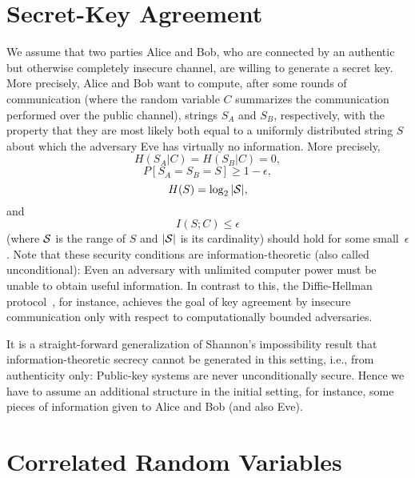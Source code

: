 \documentclass[a4paper, twoside, openany]{report}
\newcommand{\eps}{\epsilon}
\theoremstyle{plain}
\theoremstyle{definition}
\begin{document}

\section{Secret-Key Agreement}

We assume that two parties Alice and Bob, who are connected by an authentic but otherwise completely insecure channel, are willing to generate a secret key. More precisely, Alice and Bob want to compute, after some rounds of communication (where the random variable $C$ summarizes the communication performed over the public channel), strings $S_A$ and $S_B$, respectively, with the property that they are most likely both equal to a uniformly distributed string $S$ about which the adversary Eve has virtually no information.
More precisely,
\begin{equation} \label{ska:determined}
H(S_A|C) = H(S_B|C) = 0,
\end{equation}
\begin{equation} \label{ska:identical}
P[S_A = S_B = S] \geq 1-\eps,
\end{equation}
\begin{equation} \label{ska:uniform}
H(S)=\log_2|{\cal S}|,
\end{equation}
and
\begin{equation} \label{ska:secret}
I(S;C) \leq \eps
\end{equation}
(where ${\cal S}$ is the range of $S$ and $|{\cal S}|$ is its cardinality) should hold for some small~$\eps$. 
Note that these security conditions are information-theoretic (also called unconditional): Even an adversary with unlimited computer power must be unable to obtain useful information. In contrast to this, the Diffie-Hellman protocol~\cite{difhel76}, for instance, achieves the goal of key agreement by insecure communication only with respect to computationally bounded adversaries.

It is a straight-forward generalization of Shannon's impossibility result that information-theoretic secrecy cannot be generated in this setting, i.e., from authenticity only: Public-key systems are never unconditionally secure. Hence we have to assume an additional structure in the initial setting, for instance, some pieces of information given to Alice and Bob (and also Eve).


\section{Correlated Random Variables}
\end{document}
